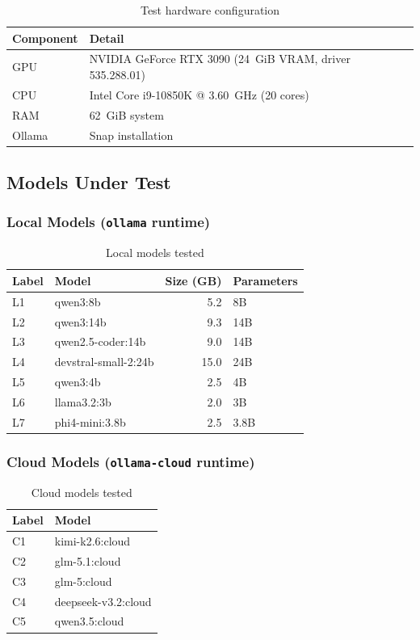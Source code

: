 \documentclass[11pt,a4paper]{article}
\begin{document}
\begin{table}[H]
\centering
\begin{tabular}{ll}
\toprule
Component & Detail \\
\midrule
GPU     & NVIDIA GeForce RTX 3090 (24~GiB VRAM, driver 535.288.01) \\
CPU     & Intel Core i9-10850K @ 3.60~GHz (20 cores) \\
RAM     & 62~GiB system \\
Ollama  & Snap installation \\
\bottomrule
\end{tabular}
\caption{Test hardware configuration}
\end{table}

\subsection{Models Under Test}

\subsubsection{Local Models (\texttt{ollama} runtime)}

\begin{table}[H]
\centering
\begin{tabular}{llrl}
\toprule
Label & Model               & Size (GB) & Parameters \\
\midrule
L1    & qwen3:8b            & 5.2  & 8B  \\
L2    & qwen3:14b           & 9.3  & 14B \\
L3    & qwen2.5-coder:14b   & 9.0  & 14B \\
L4    & devstral-small-2:24b & 15.0 & 24B \\
L5    & qwen3:4b            & 2.5  & 4B  \\
L6    & llama3.2:3b         & 2.0  & 3B  \\
L7    & phi4-mini:3.8b      & 2.5  & 3.8B \\
\bottomrule
\end{tabular}
\caption{Local models tested}
\end{table}

\subsubsection{Cloud Models (\texttt{ollama-cloud} runtime)}

\begin{table}[H]
\centering
\begin{tabular}{ll}
\toprule
Label & Model \\
\midrule
C1 & kimi-k2.6:cloud \\
C2 & glm-5.1:cloud \\
C3 & glm-5:cloud \\
C4 & deepseek-v3.2:cloud \\
C5 & qwen3.5:cloud \\
\bottomrule
\end{tabular}
\caption{Cloud models tested}
\end{table}
\end{document}
